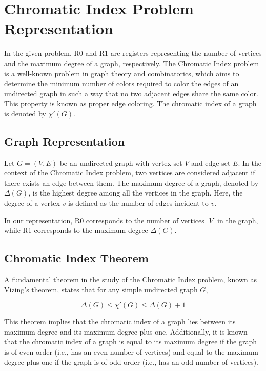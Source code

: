 \section{Chromatic Index Problem Representation}

In the given problem, R0 and R1 are registers representing the number of vertices and the maximum degree of a graph, respectively. The Chromatic Index problem is a well-known problem in graph theory and combinatorics, which aims to determine the minimum number of colors required to color the edges of an undirected graph in such a way that no two adjacent edges share the same color. This property is known as proper edge coloring. The chromatic index of a graph is denoted by $\chi'(G)$.

\subsection{Graph Representation}

Let $G = (V, E)$ be an undirected graph with vertex set $V$ and edge set $E$. In the context of the Chromatic Index problem, two vertices are considered adjacent if there exists an edge between them. The maximum degree of a graph, denoted by $\Delta(G)$, is the highest degree among all the vertices in the graph. Here, the degree of a vertex $v$ is defined as the number of edges incident to $v$.

In our representation, R0 corresponds to the number of vertices $|V|$ in the graph, while R1 corresponds to the maximum degree $\Delta(G)$.

\subsection{Chromatic Index Theorem}

A fundamental theorem in the study of the Chromatic Index problem, known as Vizing's theorem, states that for any simple undirected graph $G$,

\begin{equation}
\Delta(G) \leq \chi'(G) \leq \Delta(G) + 1
\end{equation}

This theorem implies that the chromatic index of a graph lies between its maximum degree and its maximum degree plus one. Additionally, it is known that the chromatic index of a graph is equal to its maximum degree if the graph is of even order (i.e., has an even number of vertices) and equal to the maximum degree plus one if the graph is of odd order (i.e., has an odd number of vertices).

